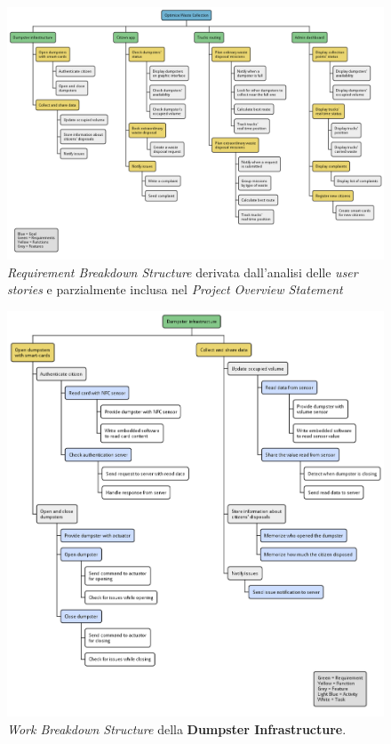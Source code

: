 \begin{figure}[H]
    \centering
    \includegraphics[width=\textwidth]{uml/requirement-breakdown-structure.pm}
    \caption{\textit{Requirement Breakdown Structure} derivata dall'analisi delle \textit{user stories} e parzialmente inclusa nel \textit{Project Overview Statement}  }
    \label{fig:uml/requirement-breakdown-structure}
\end{figure}


\begin{figure}[H]
    \centering
    \includegraphics[width=\textwidth]{uml/wbs-dumpster-infrastructure.pm}
    \caption{\textit{Work Breakdown Structure} della \textbf{Dumpster Infrastructure}.}
    \label{fig:uml/wbs-dumpster-infrastructure}
\end{figure}


